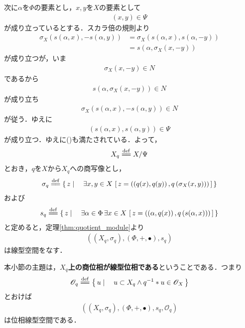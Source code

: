 	次に$\alpha$を$\Phi$の要素とし，$x,y$を$X$の要素として
	\begin{align}
		(x,y) \in \Psi
	\end{align}
	が成り立っているとする．スカラ倍の規則より
	\begin{align}
		\sigma_X\left(s(\alpha,x),-s(\alpha,y)\right)
		&= \sigma_X\left(s(\alpha,x),s(\alpha,-y)\right) \\
		&= s\left(\alpha,\sigma_X(x,-y)\right)
	\end{align}
	が成り立つが，いま
	\begin{align}
		\sigma_X(x,-y) \in N
	\end{align}
	であるから
	\begin{align}
		s\left(\alpha,\sigma_X(x,-y)\right) \in N
	\end{align}
	が成り立ち
	\begin{align}
		\sigma_X\left(s(\alpha,x),-s(\alpha,y)\right) \in N
	\end{align}
	が従う．ゆえに
	\begin{align}
		\left(s(\alpha,x),s(\alpha,y)\right) \in \Psi
	\end{align}
	が成り立つ．ゆえに()も満たされている．よって，
	\begin{align}
		X_q \defeq X/\Psi
	\end{align}
	とおき，$q$を$X$から$X_q$への商写像とし，
	\begin{align}
		\sigma_q \defeq \Set{z}{\exists x,y \in X\, 
		\left[\, z=\left(\left(q(x),q(y)\right),q\left(\sigma_X(x,y)\right)\right)\, \right]}
	\end{align}
	および
	\begin{align}
		s_q \defeq \Set{z}{\exists \alpha \in \Phi\, \exists x \in X\, 
		\left[\, z=\left(\left(\alpha,q(x)\right),q\left(s(\alpha,x)\right)\right)\, \right]}
	\end{align}
	と定めると，定理\ref{thm:quotient_module}より
	\begin{align}
		\left(\left(X_q,\sigma_q\right),\left(\Phi,+,\bullet\right),s_q\right)
	\end{align}
	は線型空間をなす．
	
	本小節の主題は，{\bf $X_q$上の商位相が線型位相である}ということである．つまり
	\begin{align}
		\mathscr{O}_q \defeq \Set{u}{u \subset X_q \wedge q^{-1} \ast u \in \mathscr{O}_X}
	\end{align}
	とおけば
	\begin{align}
		\left(\left(X_q,\sigma_q\right),\left(\Phi,+,\bullet\right),s_q,\mathscr{O}_q\right)
	\end{align}
	は位相線型空間である．
	
